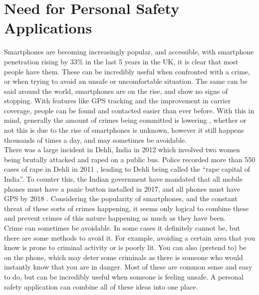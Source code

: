 \documentclass[a4paper]{report}
\begin{document}
\section{Need for Personal Safety Applications}
\label{sec:NeedForPSA}
Smartphones are becoming increasingly popular, and accessible, with smartphone penetration rising by 33\% in the last 5 years \cite{penetration} in the UK, it is clear that most people have them. These can be
incredibly useful when confronted with a crime, or when trying to avoid an unsafe or uncomfortable situation. The same can be said around the world, smartphones are on the rise, and show no
signs of stopping. With features like GPS tracking and the improvement in carrier coverage, people can be found and contacted easier than ever before. With this in mind, generally the amount of crimes being committed is lowering \cite{boj}, whether
or not this is due to the rise of smartphones is unknown, however it still happens thousands of times a day, and may sometimes be avoidable. \\
There was a large incident in Dehli, India in 2012 which involved two women being brutally attacked \cite{newdehlicnn} and raped on a public bus. Police recorded more than 550 cases of rape in Dehli in 2011 \cite{newdehlibbc}, leading to
Dehli being called the ``rape capital of India''. To counter this, the Indian government have mandated that all mobile phones must have a panic button installed in 2017, and all phones
must have GPS by 2018 \cite{panicbuttonindia}.
Considering the popularity of smartphones, and the constant threat of these sorts of crimes happening, it seems only logical to combine these and prevent crimes of this nature happening
as much as they have been. \\
Crime can sometimes be avoidable. In some cases it definitely cannot be, but there are some methods to avoid it. For example, avoiding a certain
area that you know is prone to criminal activity or is poorly lit. You can also (pretend to) be on the phone, which may deter some criminals as there is someone who would instantly know that
you are in danger. Most of these are common sense and easy to do, but can be incredibly useful when someone is feeling unsafe. A personal safety application can combine all
of these ideas into one place.
\end{document}
